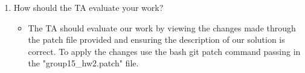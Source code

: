 \documentclass[10pt,draftclsnofoot,onecolumn]{IEEEtran}
\begin{document}
\begin{enumerate}
\begin{itemize}
        \end{itemize}
        \item How should the TA evaluate your work?
        \begin{itemize}
        	\item The TA should evaluate our work by viewing the changes made through the patch file provided and ensuring the description of our solution is correct. To apply the changes use the bash git patch command passing in the "group15\_hw2.patch" file. 
        \end{itemize}
    \end{enumerate}

\nocite{*}

\end{document}
